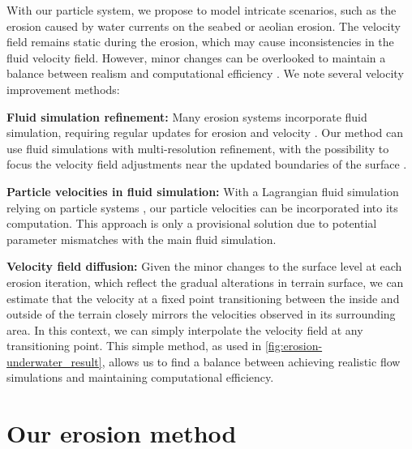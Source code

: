 With our particle system, we propose to model intricate scenarios, such as the erosion caused by water currents on the seabed or aeolian erosion. The velocity field remains static during the erosion, which may cause inconsistencies in the fluid velocity field. However, minor changes can be overlooked to maintain a balance between realism and computational efficiency \cite{Tychonievich2010}. We note several velocity improvement methods: 
\begin{Itemize}
    \Item{} \textbf{Fluid simulation refinement:} Many erosion systems incorporate fluid simulation, requiring regular updates for erosion and velocity \cite{Kristof2009, Wojtan2007}. Our method can use fluid simulations with multi-resolution refinement, with the possibility to focus the velocity field adjustments near the updated boundaries of the surface \cite{Roose2011}. 
    
    \Item{} \textbf{Particle velocities in fluid simulation:} With a Lagrangian fluid simulation relying on particle systems \cite{Koschier2022}, our particle velocities can be incorporated into its computation. This approach is only a provisional solution due to potential parameter mismatches with the main fluid simulation. 

    \Item{} \textbf{Velocity field diffusion:} Given the minor changes to the surface level at each erosion iteration, which reflect the gradual alterations in terrain surface, we can estimate that the velocity at a fixed point transitioning between the inside and outside of the terrain closely mirrors the velocities observed in its surrounding area. In this context, we can simply interpolate the velocity field at any transitioning point. This simple method, as used in \cref{fig:erosion-underwater_result}, allows us to find a balance between achieving realistic flow simulations and maintaining computational efficiency.
\end{Itemize}

\section{Our erosion method}
\label{sec:erosion-application-on-representations}


